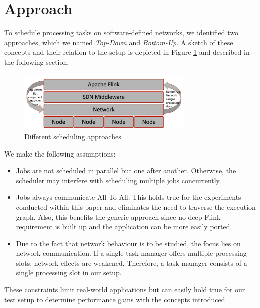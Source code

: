 \section{Approach}
To schedule processing tasks on software-defined networks, we identified two approaches, which we
named \textit{Top-Down} and \textit{Bottom-Up}. A sketch of these concepts and their relation to the
setup is depicted in Figure \ref{fig:schedulingapproaches} and described in the following section.

\begin{figure}[h]
    \centering
    \includegraphics[width=0.75\textwidth]{graphics/schedulingapproaches.png}
    \caption{Different scheduling approaches}
    \label{fig:schedulingapproaches}
\end{figure}

We make the following assumptions:
\begin{itemize}
\item Jobs are not scheduled in parallel but one after another. Otherwise, the scheduler may
interfere with scheduling multiple jobs concurrently.

\item Jobs always communicate All-To-All. This holds true for the experiments conducted within this
paper and eliminates the need to traverse the execution graph. Also, this benefits the generic
approach since no deep Flink requirement is built up and the application can be more easily ported.

\item Due to the fact that network behaviour is to be studied, the focus lies on network
communication. If a single task manager offers multiple processing slots, network effects are
weakened. Therefore, a task manager consists of a single processing slot in our setup.
\end{itemize}

These constraints limit real-world applications but can easily hold true for our test setup to
determine performance gains with the concepts introduced.

